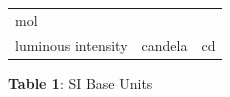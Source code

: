 {{\begin{center}
\begin{tabular}[t]{|l|l|l|}
        mol%
     \tabularnewline\cline{1-1}\cline{2-2}\cline{3-3}
    
    
        luminous intensity &
    
    
        candela &
    
    
        cd%
     \tabularnewline\cline{1-1}\cline{2-2}\cline{3-3}
    \end{tabular}
      \end{center}
    \begin{center}{\small\bfseries Table 1}: SI Base Units\end{center}
    
    \addtocounter{footnote}{-0}
    
          }{ %
        
    
        \begin{center}
      
      \label{m30853*uid2}
      
    \noindent
      \tablelasttail{}
      \begin{xtabular}[t]{|l|l|l|}\hline
    

\end{xtabular}
\end{center}}}
